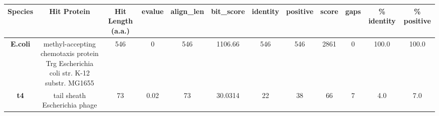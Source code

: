 \begin{tabular}{|c|c|c|c|c|c|c|c|c|c|c|c|} \hline
\textbf{Species} & \textbf{Hit Protein} & \textbf{Hit Length (a.a.)} & \textbf{evalue} & \textbf{align\_len} & \textbf{bit\_score} & \textbf{identity} & \textbf{positive} & \textbf{score} & \textbf{gaps} & \textbf{\% identity} & \textbf{\% positive} \\ \hline
\textbf{E.coli} & methyl-accepting chemotaxis protein Trg Escherichia coli str. K-12 substr. MG1655 & 546 & 0 & 546 & 1106.66 & 546 & 546 & 2861 & 0 & 100.0 & 100.0\\
\textbf{t4} & tail sheath Escherichia phage  & 73 & 0.02 & 73 & 30.0314 & 22 & 38 & 66 & 7 & 4.0 & 7.0\\
\hline \end{tabular}
